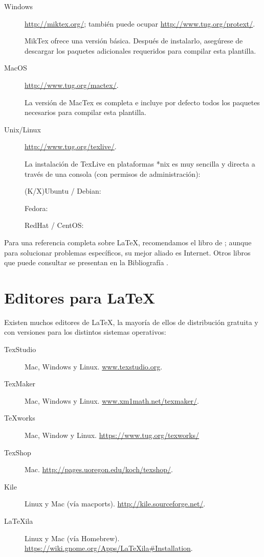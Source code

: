 \begin{description}
\item [Windows] \href{http://miktex.org/}{http://miktex.org/}; también puede
ocupar \href{http://www.tug.org/protext/}{http://www.tug.org/protext/}.

MikTex ofrece una versión básica. Después de instalarlo, asegúrese de descargar los paquetes adicionales requeridos para compilar esta plantilla.

\item [MacOS] \href{http://www.tug.org/mactex/}{http://www.tug.org/mactex/}.

La versión de MacTex es completa e incluye por defecto todos los paquetes necesarios para compilar esta plantilla.

\item [Unix/Linux] \href{http://www.tug.org/texlive/}{http://www.tug.org/texlive/}.

La instalación de TexLive en plataformas *nix es muy sencilla y directa a través de una consola (con permisos de administración):

(K/X)Ubuntu / Debian: 

Fedora: 

RedHat / CentOS: 
\end{description}

Para una referencia completa sobre \LaTeX{}, recomendamos el libro
de \citealp{Lamport94}; aunque para solucionar problemas específicos,
su mejor aliado es Internet. Otros libros que puede consultar se presentan
en la Bibliografía \citep{Mittelbach04,Oetiker06,Roberts05,Borbon2014}.


\section{Editores para \LaTeX}
Existen muchos editores de \LaTeX, la mayoría de ellos de distribución gratuita y con versiones para los distintos sistemas operativos:
\begin{description}
    \item [TexStudio] Mac, Windows y Linux. \href{www.texstudio.org}{www.texstudio.org}.
    \item [TexMaker] Mac, Windows y Linux.  \href{www.xm1math.net/texmaker/}{www.xm1math.net/texmaker/}.
    \item[TeXworks] Mac, Window y Linux. \href{https://www.tug.org/texworks/}{https://www.tug.org/texworks/}
    \item [TexShop] Mac. \href{http://pages.uoregon.edu/koch/texshop/}{http://pages.uoregon.edu/koch/texshop/}.
    \item[Kile] Linux y Mac (vía macports). \href{http://kile.sourceforge.net/}{http://kile.sourceforge.net/}.
    \item[LaTeXila] Linux y Mac (vía Homebrew). \href{https://wiki.gnome.org/Apps/LaTeXila\#Installation}{https://wiki.gnome.org/Apps/LaTeXila\#Installation}.
\end{description}

